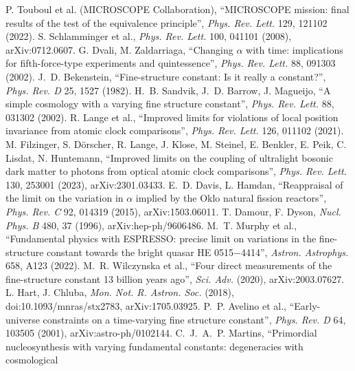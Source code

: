  P. Touboul et al. (MICROSCOPE Collaboration), ``MICROSCOPE mission: final results of the test of the equivalence
principle'', \emph{Phys. Rev. Lett.} 129, 121102 (2022).
 S. Schlamminger et al., \emph{Phys. Rev. Lett.} 100, 041101 (2008), arXiv:0712.0607.
 G. Dvali, M. Zaldarriaga, ``Changing $\alpha$ with time: implications for fifth-force-type experiments and quintessence'',
\emph{Phys. Rev. Lett.} 88, 091303 (2002).
 J.~D. Bekenstein, ``Fine-structure constant: Is it really a constant?'', \emph{Phys. Rev. D} 25, 1527 (1982).
 H.~B. Sandvik, J.~D. Barrow, J. Magueijo, ``A simple cosmology with a varying fine structure constant'', \emph{Phys. Rev.
Lett.} 88, 031302 (2002).
 R. Lange et al., ``Improved limits for violations of local position invariance from atomic clock comparisons'',
\emph{Phys. Rev. Lett.} 126, 011102 (2021).
 M. Filzinger, S. D\"orscher, R. Lange, J. Klose, M. Steinel, E. Benkler, E. Peik, C. Lisdat, N. Huntemann,
``Improved limits on the coupling of ultralight bosonic dark matter to photons from optical atomic clock comparisons'', \emph{Phys. Rev.
Lett.} 130, 253001 (2023), arXiv:2301.03433.
 E.~D. Davis, L. Hamdan, ``Reappraisal of the limit on the variation in $\alpha$ implied by the Oklo natural fission
reactors'', \emph{Phys. Rev. C} 92, 014319 (2015), arXiv:1503.06011.
 T. Damour, F. Dyson, \emph{Nucl. Phys. B} 480, 37 (1996), arXiv:hep-ph/9606486.
 M.~T. Murphy et al., ``Fundamental physics with ESPRESSO: precise limit on variations in the fine-structure constant
towards the bright quasar HE 0515$-$4414'', \emph{Astron. Astrophys.} 658, A123 (2022).
 M.~R. Wilczynska et al., ``Four direct measurements of the fine-structure constant 13 billion years ago'',
\emph{Sci. Adv.} (2020), arXiv:2003.07627.
 L. Hart, J. Chluba, \emph{Mon. Not. R. Astron. Soc.} (2018), doi:10.1093/mnras/stx2783, arXiv:1705.03925.
 P.~P. Avelino et al., ``Early-universe constraints on a time-varying fine structure constant'', \emph{Phys. Rev. D}
64, 103505 (2001), arXiv:astro-ph/0102144.
 C.~J.~A.~P. Martins, ``Primordial nucleosynthesis with varying fundamental constants: degeneracies with cosmological
